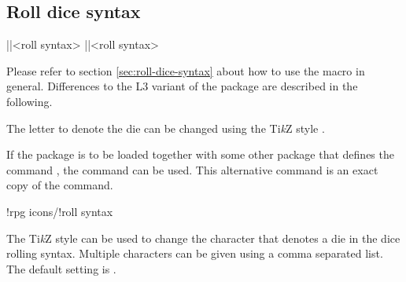 \documentclass[a4paper]{article}
\begin{document}
\subsection{Roll dice syntax}

\begin{macrodef}
|\roll|{<roll syntax>}
|\rpgiconsroll|{<roll syntax>}
\end{macrodef}
Please refer to section \ref{sec:roll-dice-syntax} about how to use the \macro{\roll} macro in general. Differences to the L3 variant of the package are described in the following.

The letter to denote the die can be changed using the Ti\emph{k}Z style .

If the  package is to be loaded together with some other package that defines the command \macro{\roll}, the command \macro{\rpgiconsroll} can be used. This alternative command is an exact copy of the \macro{\roll} command.

\begin{macrodef}
!rpg icons/!roll syntax
\end{macrodef}
The Ti\emph{k}Z style  can be used to change the character that denotes a die in the dice rolling syntax. Multiple characters can be given using a comma separated list. The default setting is .


\printchanges
\end{document}
